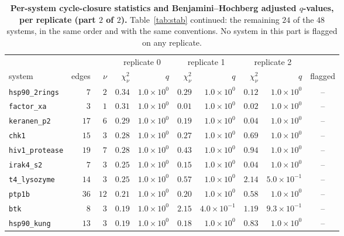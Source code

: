 \begin{table}[tp]\centering
\caption{\textbf{Per-system cycle-closure statistics and Benjamini--Hochberg adjusted
$q$-values, per replicate (part $2$ of $2$).} Table~\ref{tab:stab} continued: the remaining $24$
of the $48$ systems, in the same order and with the same conventions. No system in this part is
flagged on any replicate.}
\label{tab:stab2}
\footnotesize
\setlength{\tabcolsep}{3.4pt}
\begin{tabular}{@{}lrrrrrrrrc@{}}
\toprule
& & & \multicolumn{2}{c}{replicate 0} & \multicolumn{2}{c}{replicate 1} &
\multicolumn{2}{c}{replicate 2} & \\
\cmidrule(lr){4-5}\cmidrule(lr){6-7}\cmidrule(lr){8-9}
system & edges & $\nu$ & $\chi^2_\nu$ & $q$ & $\chi^2_\nu$ & $q$ & $\chi^2_\nu$ & $q$ &
flagged \\
\midrule
\texttt{hsp90\_2rings} & $7$ & $2$ & $0.34$ & $1.0{\times}10^{0}$ & $0.29$ & $1.0{\times}10^{0}$ & $0.12$ & $1.0{\times}10^{0}$ & -- \\
\texttt{factor\_xa} & $3$ & $1$ & $0.31$ & $1.0{\times}10^{0}$ & $0.01$ & $1.0{\times}10^{0}$ & $0.02$ & $1.0{\times}10^{0}$ & -- \\
\texttt{keranen\_p2} & $17$ & $6$ & $0.29$ & $1.0{\times}10^{0}$ & $0.19$ & $1.0{\times}10^{0}$ & $0.04$ & $1.0{\times}10^{0}$ & -- \\
\texttt{chk1} & $15$ & $3$ & $0.28$ & $1.0{\times}10^{0}$ & $0.27$ & $1.0{\times}10^{0}$ & $0.69$ & $1.0{\times}10^{0}$ & -- \\
\texttt{hiv1\_protease} & $19$ & $7$ & $0.28$ & $1.0{\times}10^{0}$ & $0.43$ & $1.0{\times}10^{0}$ & $0.94$ & $1.0{\times}10^{0}$ & -- \\
\texttt{irak4\_s2} & $7$ & $3$ & $0.25$ & $1.0{\times}10^{0}$ & $0.15$ & $1.0{\times}10^{0}$ & $0.04$ & $1.0{\times}10^{0}$ & -- \\
\texttt{t4\_lysozyme} & $14$ & $3$ & $0.25$ & $1.0{\times}10^{0}$ & $0.57$ & $1.0{\times}10^{0}$ & $2.14$ & $5.0{\times}10^{-1}$ & -- \\
\texttt{ptp1b} & $36$ & $12$ & $0.21$ & $1.0{\times}10^{0}$ & $0.20$ & $1.0{\times}10^{0}$ & $0.58$ & $1.0{\times}10^{0}$ & -- \\
\texttt{btk} & $8$ & $3$ & $0.19$ & $1.0{\times}10^{0}$ & $2.15$ & $4.0{\times}10^{-1}$ & $1.19$ & $9.3{\times}10^{-1}$ & -- \\
\texttt{hsp90\_kung} & $13$ & $3$ & $0.19$ & $1.0{\times}10^{0}$ & $0.18$ & $1.0{\times}10^{0}$ & $0.83$ & $1.0{\times}10^{0}$ & -- \\

\end{tabular}
\end{table}

